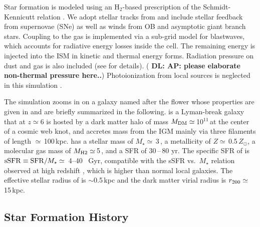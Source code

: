 \IfFileExists{emulateapjlegacy.cls}{\documentclass[iop]{emulateapjlegacy}}{\documentclass[iop]{emulateapj}}
\newcommand{\AP}[1]{({\bf \color{apcolor} AP: #1})}
\newcommand{\DL}[1]{({\bf \color{dlcolor} DL: #1})}
\newcommand{\MM}[1]{({\bf \color{mmcolor} MM: #1})}
\begin{document}
Star formation is modeled using an H$_2$-based prescription of the Schmidt-Kennicutt relation \citep{Krumholz09a}. We adopt stellar tracks from  and include stellar feedback from supernovae (SNe) 
   as well as winds from OB and asymptotic giant branch stars.
Coupling to the gas is implemented via a sub-grid model for blastwaves, which accounts for radiative energy losses inside the cell. The remaining energy is injected into the ISM in kinetic and thermal energy forms. Radiation pressure on dust and gas is also included (see \citealt{Pallottini17a} for details).  
\DL{AP: please elaborate non-thermal pressure here..}
Photoionization from local sources is neglected in this simulation
\citep[see][for its effect]{pallottini:2019,decataldo:2019}. 

The simulation zooms in on a galaxy named after the flower 
\flower whose properties are given in 
      \citet{Pallottini17a} 
and are briefly summarized in the following. \flower is a Lyman-break galaxy 
that at $z\simeq 6$ is hosted by a dark matter halo of mass $M_{\rm
  DM}\simeq$\,10$^{11}$\,\Msun at the center of a cosmic web knot, and
accretes mass from the IGM mainly via three filaments of length
$\simeq$\,100\,kpc. \flower has a stellar mass of
$M_\star\simeq$\,3\,\Msun, a metallicity of
$Z\simeq$\,0.5\,$Z_{\odot}$, a molecular gas mass of $M_{\rm
  H2}\simeq$\,5\,\Msun, and a SFR of 30\,--\,80\,\Msun\,yr\pmOne. 
The specific SFR of \flower is ${\rm sSFR} \equiv {\rm SFR}/M_{\star}
\simeq$~4--40 ~Gyr\pmOne, compatible with the sSFR vs.\ $M_{\star}$
relation observed at high redshift \citep{Jiang2016}, which is higher
than normal local galaxies. The effective stellar radius of \flower
is $\sim$0.5\,kpc and the dark matter virial radius is $r_{\rm
  200}\simeq$\,15\,kpc. 

\subsection{Star Formation History} \label{sec:sfh}
\end{document}
